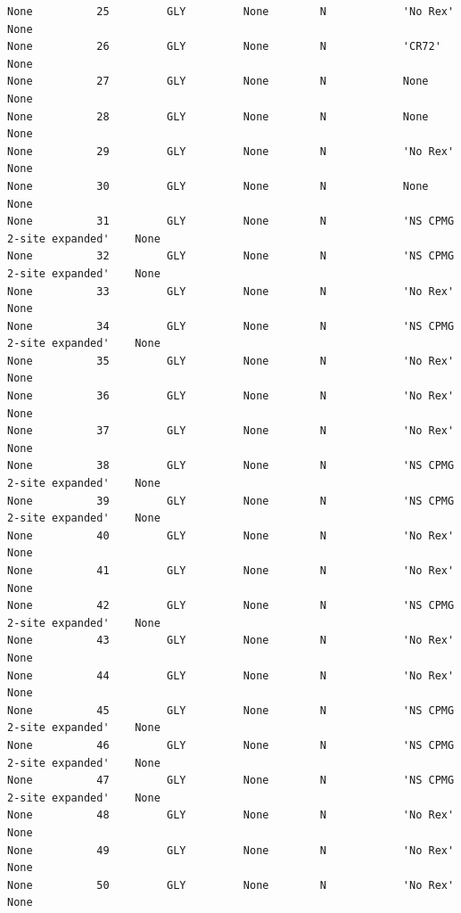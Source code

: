 \begin{lstlisting}[basicstyle=\ttfamily \scriptsize,numbers=none]
None          25         GLY         None        N            'No Rex'                     None     
None          26         GLY         None        N            'CR72'                       None     
None          27         GLY         None        N            None                         None     
None          28         GLY         None        N            None                         None     
None          29         GLY         None        N            'No Rex'                     None     
None          30         GLY         None        N            None                         None     
None          31         GLY         None        N            'NS CPMG 2-site expanded'    None     
None          32         GLY         None        N            'NS CPMG 2-site expanded'    None     
None          33         GLY         None        N            'No Rex'                     None     
None          34         GLY         None        N            'NS CPMG 2-site expanded'    None     
None          35         GLY         None        N            'No Rex'                     None     
None          36         GLY         None        N            'No Rex'                     None     
None          37         GLY         None        N            'No Rex'                     None     
None          38         GLY         None        N            'NS CPMG 2-site expanded'    None     
None          39         GLY         None        N            'NS CPMG 2-site expanded'    None     
None          40         GLY         None        N            'No Rex'                     None     
None          41         GLY         None        N            'No Rex'                     None     
None          42         GLY         None        N            'NS CPMG 2-site expanded'    None     
None          43         GLY         None        N            'No Rex'                     None     
None          44         GLY         None        N            'No Rex'                     None     
None          45         GLY         None        N            'NS CPMG 2-site expanded'    None     
None          46         GLY         None        N            'NS CPMG 2-site expanded'    None     
None          47         GLY         None        N            'NS CPMG 2-site expanded'    None     
None          48         GLY         None        N            'No Rex'                     None     
None          49         GLY         None        N            'No Rex'                     None     
None          50         GLY         None        N            'No Rex'                     None     

\end{lstlisting}
